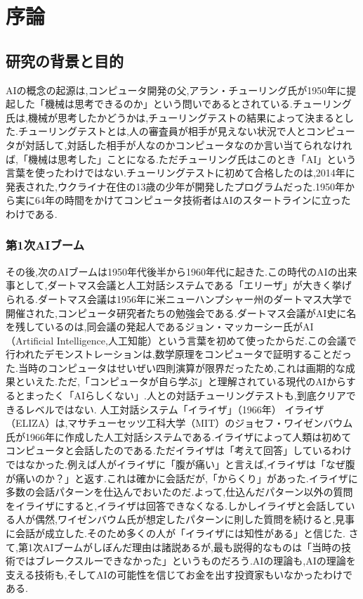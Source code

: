 \chapter{序論}
\section{研究の背景と目的}
AIの概念の起源は,コンピュータ開発の父,アラン・チューリング氏が1950年に提起した「機械は思考できるのか」という問いであるとされている.チューリング氏は,機械が思考したかどうかは,チューリングテストの結果によって決まるとした.チューリングテストとは,人の審査員が相手が見えない状況で人とコンピュータが対話して,対話した相手が人なのかコンピュータなのか言い当てられなければ,「機械は思考した」ことになる.ただチューリング氏はこのとき「AI」という言葉を使ったわけではない.チューリングテストに初めて合格したのは,2014年に発表された,ウクライナ在住の13歳の少年が開発したプログラムだった.1950年から実に64年の時間をかけてコンピュータ技術者はAIのスタートラインに立ったわけである.
\subsection{第1次AIブーム}
その後,次のAIブームは1950年代後半から1960年代に起きた.この時代のAIの出来事として,ダートマス会議と人工対話システムである「エリーザ」が大きく挙げられる.ダートマス会議は1956年に米ニューハンプシャー州のダートマス大学で開催された,コンピュータ研究者たちの勉強会である.ダートマス会議がAI史に名を残しているのは,同会議の発起人であるジョン・マッカーシー氏がAI（Artificial Intelligence,人工知能）という言葉を初めて使ったからだ.この会議で行われたデモンストレーションは,数学原理をコンピュータで証明することだった.当時のコンピュータはせいぜい四則演算が限界だったため,これは画期的な成果といえた.ただ,「コンピュータが自ら学ぶ」と理解されている現代のAIからするとまったく「AIらしくない」.人との対話チューリングテストも,到底クリアできるレベルではない. 人工対話システム「イライザ」（1966年） イライザ（ELIZA）は,マサチューセッツ工科大学（MIT）のジョセフ・ワイゼンバウム氏が1966年に作成した人工対話システムである.イライザによって人類は初めてコンピュータと会話したのである.ただイライザは「考えて回答」しているわけではなかった.例えば人がイライザに「腹が痛い」と言えば,イライザは「なぜ腹が痛いのか？」と返す.これは確かに会話だが,「からくり」があった.イライザに多数の会話パターンを仕込んでおいたのだ.よって,仕込んだパターン以外の質問をイライザにすると,イライザは回答できなくなる.しかしイライザと会話している人が偶然,ワイゼンバウム氏が想定したパターンに則した質問を続けると,見事に会話が成立した.そのため多くの人が「イライザには知性がある」と信じた. さて,第1次AIブームがしぼんだ理由は諸説あるが,最も説得的なものは「当時の技術ではブレークスルーできなかった」というものだろう.AIの理論も,AIの理論を支える技術も,そしてAIの可能性を信じてお金を出す投資家もいなかったわけである.
